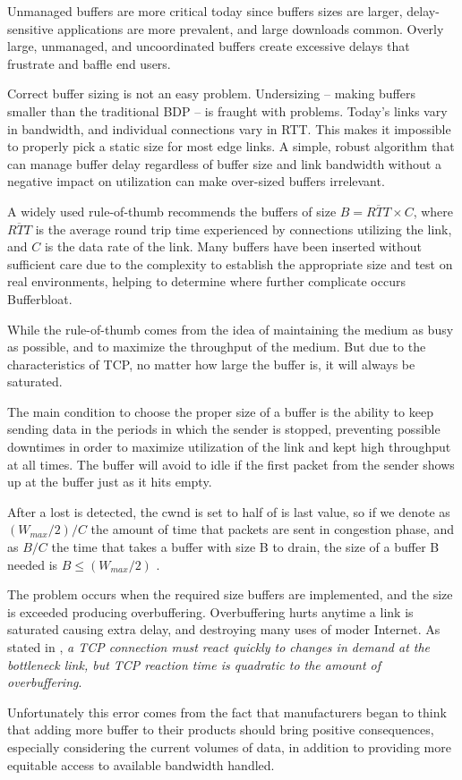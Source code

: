 Unmanaged buffers are more critical today since buffers sizes are larger,
delay-sensitive applications are more prevalent, and large downloads common.
Overly large, unmanaged, and uncoordinated buffers create excessive delays
that frustrate and baffle end users.

Correct buffer sizing is not an easy problem. Undersizing -- making buffers
smaller than the traditional BDP -- is fraught with problems. Today's links vary
in bandwidth, and individual connections vary in RTT. This makes it impossible
to properly pick a static size for most edge links. A simple, robust algorithm
that can manage buffer delay regardless of buffer size and link bandwidth
without a negative impact on utilization can make over-sized buffers
irrelevant.

A widely used rule-of-thumb recommends the buffers of size $B = \overline{RTT}
\times C $, where $\overline{RTT}$ is the average round trip time experienced by
connections utilizing the link, and $C$ is the data rate of the link. Many
buffers have been inserted without sufficient care due to the complexity to
establish the appropriate size and test on real environments\cite{Vu-Brugier},
helping to determine where further complicate occurs Bufferbloat.

While the rule-of-thumb comes from the idea of ​​maintaining the medium as
busy as possible, and to maximize the throughput of the medium. But due to the
characteristics of TCP, no matter how large the buffer is, it will always be
saturated.

The main condition to choose the proper size of a buffer is the ability to
keep sending data in the periods in which the sender is stopped, preventing
possible downtimes in order to maximize utilization of the link and kept high
throughput at all times. The buffer will avoid to idle if the first packet
from the sender shows up at the buffer just as it hits empty.

After a lost is detected, the cwnd is set to half of is last value, so if we
denote as $(W_{max} /2)/C$ the amount of time that packets are sent in
congestion phase, and as $B/C$ the time that takes a buffer with size B to
drain, the size of a buffer B needed is $B \leq (W_{max} /2)$
\cite{main:ref:1}.

The problem occurs when the required size buffers are implemented, and the
size is exceeded producing overbuffering. Overbuffering hurts anytime a link
is saturated causing extra delay, and destroying many uses of moder Internet.
As stated in \cite{GettysNichols}, \textit{a TCP connection must react quickly
to changes in demand at the bottleneck link, but TCP reaction time is
quadratic to the amount of overbuffering}.

Unfortunately this error comes from the fact that manufacturers began to think
that adding more buffer to their products should bring positive consequences,
especially considering the current volumes of data, in addition to providing
more equitable access to available bandwidth handled.
